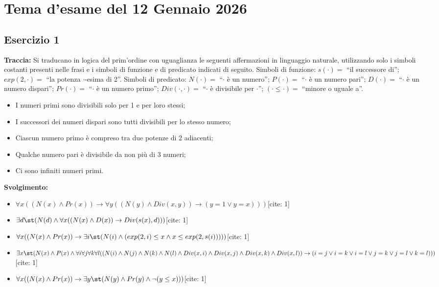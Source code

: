 \chapter{Tema d'esame del 12 Gennaio 2026}
\section*{Esercizio 1}

\textbf{Traccia:}
Si traducano in logica del prim'ordine con uguaglianza le seguenti affermazioni in linguaggio naturale, utilizzando solo i simboli costanti presenti nelle frasi e i simboli di funzione e di predicato indicati di seguito. Simboli di funzione: $s(\cdot) = $ ``il successore di''; $exp(2,\cdot) = $ ``la potenza $\cdot$-esima di 2''. Simboli di predicato: $N(\cdot) = $ ``$\cdot$ è un numero''; $P(\cdot) = $ ``$\cdot$ è un numero pari''; $D(\cdot) = $ ``$\cdot$ è un numero dispari''; $Pr(\cdot) = $ ``$\cdot$ è un numero primo''; $Div(\cdot,\cdot) = $ ``$\cdot$ è divisibile per $\cdot$''; $(\cdot \le \cdot) = $ ``minore o uguale a''.
\begin{itemize}
    \item[(a)] I numeri primi sono divisibili solo per 1 e per loro stessi;
    \item[(b)] I successori dei numeri dispari sono tutti divisibili per lo stesso numero;
    \item[(c)] Ciascun numero primo è compreso tra due potenze di 2 adiacenti;
    \item[(d)] Qualche numero pari è divisibile da non più di 3 numeri;
    \item[(e)] Ci sono infiniti numeri primi.
\end{itemize}

\textbf{Svolgimento:}
\begin{itemize}
    \item[(a)] \(\forall x ((N(x) \land Pr(x)) \to \forall y ((N(y) \land Div(x,y)) \to (y=1 \lor y=x)))\)[cite: 1]
    \item[(b)] \(\exists d \st (N(d) \land \forall x ((N(x) \land D(x)) \to Div(s(x), d)))\)[cite: 1]
    \item[(c)] \(\forall x ((N(x) \land Pr(x)) \to \exists i \st (N(i) \land (exp(2,i) \le x \land x \le exp(2,s(i)))))\)[cite: 1]
    \item[(d)] \(\exists x \st (N(x) \land P(x) \land \forall i \forall j \forall k \forall l ((N(i) \land N(j) \land N(k) \land N(l) \land Div(x,i) \land Div(x,j) \land Div(x,k) \land Div(x,l)) \to (i=j \lor i=k \lor i=l \lor j=k \lor j=l \lor k=l)))\)[cite: 1]
    \item[(e)] \(\forall x ((N(x) \land Pr(x)) \to \exists y \st (N(y) \land Pr(y) \land \neg(y \le x)))\)[cite: 1]
\end{itemize}


